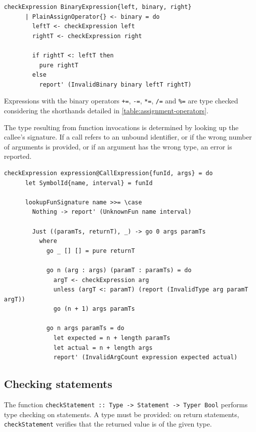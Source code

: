 \documentclass[UdineBachThesis,american,11pt]{PhdThesis}
\begin{document}
  \begin{Verbatim}[gobble=4,fontsize=\small]
    checkExpression BinaryExpression{left, binary, right}
      | PlainAssignOperator{} <- binary = do
        leftT <- checkExpression left
        rightT <- checkExpression right

        if rightT <: leftT then
          pure rightT
        else
          report' (InvalidBinary binary leftT rightT)
  \end{Verbatim}

  Expressions with the binary operators \mbox{\texttt{+=}}, \mbox{\texttt{-=}},
  \mbox{\texttt{*=}}, \mbox{\texttt{/=}} and \mbox{\texttt{\%=}} are type
  checked considering the shorthands detailed in
  \autoref{table:assignment-operators}.

  The type resulting from function invocations is determined by looking up the
  callee's signature. If a call refers to an unbound identifier, or if the wrong
  number of arguments is provided, or if an argument has the wrong type, an
  error is reported.

  \begin{Verbatim}[gobble=4,fontsize=\small]
    checkExpression expression@CallExpression{funId, args} = do
      let SymbolId{name, interval} = funId

      lookupFunSignature name >>= \case
        Nothing -> report' (UnknownFun name interval)

        Just ((paramTs, returnT), _) -> go 0 args paramTs
          where
            go _ [] [] = pure returnT

            go n (arg : args) (paramT : paramTs) = do
              argT <- checkExpression arg
              unless (argT <: paramT) (report (InvalidType arg paramT argT))
              go (n + 1) args paramTs

            go n args paramTs = do
              let expected = n + length paramTs
              let actual = n + length args
              report' (InvalidArgCount expression expected actual)
  \end{Verbatim}

  \subsection{Checking statements}

  The function \mbox{\texttt{checkStatement :: Type -> Statement -> Typer Bool}}
  performs type checking on statements. A type must be provided: on return
  statements, \mbox{\texttt{checkStatement}} verifies that the returned value is
  of the given type.
\end{document}
